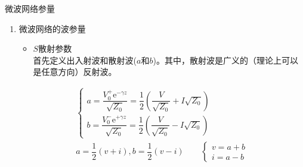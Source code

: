 \begin{frame}{微波网络参量}
    \begin{enumerate}
        \resume
        \item 微波网络的波参量
              \begin{itemize}
                  \item $S$散射参数\\
                        首先定义出入射波和散射波($a$和$b$)。其中，散射波是广义的（理论上可以是任意方向）反射波。
              \end{itemize}
              \begin{gather*}
                  \begin{cases}
                      a=\dfrac{V_0^+\mathrm{e}^{-\gamma z}}{\sqrt{Z_0}}=\dfrac{1}{2}\left(\dfrac{V}{\sqrt{Z_0}}+I\sqrt{Z_0}\right) \\
                      b=\dfrac{V_0^-\mathrm{e}^{+\gamma z}}{\sqrt{Z_0}}=\dfrac{1}{2}\left(\dfrac{V}{\sqrt{Z_0}}-I\sqrt{Z_0}\right)
                  \end{cases}\\
                  a=\dfrac{1}{2}(v+i),b=\dfrac{1}{2}(v-i)\qquad
                  \begin{cases}
                      v=a+b \\
                      i=a-b
                  \end{cases}
              \end{gather*}
    \end{enumerate}
\end{frame}

